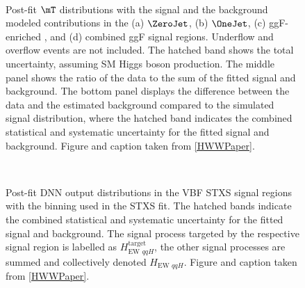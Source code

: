 \begin{figure}[htb]
  \centering
   \\
  \caption{
    Post-fit $\mT$ distributions with the signal and the background modeled contributions
    in the (a) $\ZeroJet$, (b) $\OneJet$, (c) ggF-enriched \TwoJet, and (d) combined ggF signal regions. Underflow and overflow events are not included.
    The hatched band shows the total uncertainty, assuming SM Higgs boson production.
    The middle panel shows the ratio of the data to the sum of the fitted signal and background.
    The bottom panel displays the difference between the data and the estimated background compared to the simulated signal distribution, where the hatched band indicates the combined statistical and systematic uncertainty for the fitted signal and background.
    Figure and caption taken from \cref{HWWPaper}. 
    \label{fig:ggF_MT}
  }
\end{figure}

\begin{figure}[!h]
  \centering
   \\
  \caption{
    Post-fit DNN output distributions in the VBF STXS signal regions with the binning used in the STXS fit.
    The hatched bands indicate the combined statistical and systematic uncertainty for the fitted signal and background.
    The signal process targeted by the respective signal region is labelled as $H_{\text{EW } qqH}^{\mathrm{target}}$, the other signal processes are summed and collectively denoted $H_{\text{EW } qqH}$. 
    Figure and caption taken from \cref{HWWPaper}. 
    \label{fig:aux:VBF-STXS-SRs}
  }
\end{figure}

